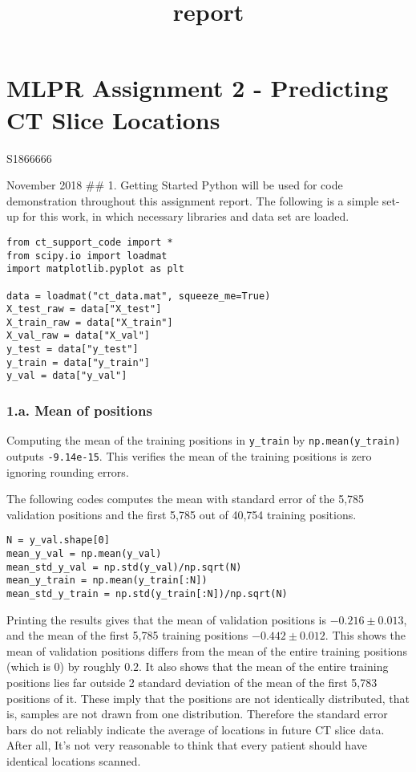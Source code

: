 \documentclass[11pt]{article}
\title{report}
\begin{document}
    
    
    \maketitle
    
    

    
    \hypertarget{mlpr-assignment-2---predicting-ct-slice-locations}{%
\section{MLPR Assignment 2 - Predicting CT Slice
Locations}\label{mlpr-assignment-2---predicting-ct-slice-locations}}

S1866666

November 2018 \#\# 1. Getting Started Python will be used for code
demonstration throughout this assignment report. The following is a
simple set-up for this work, in which necessary libraries and data set
are loaded.

\begin{verbatim}
from ct_support_code import *
from scipy.io import loadmat
import matplotlib.pyplot as plt

data = loadmat("ct_data.mat", squeeze_me=True)
X_test_raw = data["X_test"]
X_train_raw = data["X_train"]
X_val_raw = data["X_val"]
y_test = data["y_test"]
y_train = data["y_train"]
y_val = data["y_val"]
\end{verbatim}

\hypertarget{a.-mean-of-positions}{%
\subsubsection{1.a. Mean of positions}\label{a.-mean-of-positions}}

Computing the mean of the training positions in \texttt{y\_train} by
\texttt{np.mean(y\_train)} outputs \texttt{-9.14e-15}. This verifies the
mean of the training positions is zero ignoring rounding errors.

The following codes computes the mean with standard error of the 5,785
validation positions and the first 5,785 out of 40,754 training
positions.

\begin{verbatim}
N = y_val.shape[0]
mean_y_val = np.mean(y_val)
mean_std_y_val = np.std(y_val)/np.sqrt(N)
mean_y_train = np.mean(y_train[:N])
mean_std_y_train = np.std(y_train[:N])/np.sqrt(N)
\end{verbatim}

Printing the results gives that the mean of validation positions is
\(-0.216\pm 0.013\), and the mean of the first 5,785 training positions
\(-0.442\pm 0.012\). This shows the mean of validation positions differs
from the mean of the entire training positions (which is 0) by roughly
\(0.2\). It also shows that the mean of the entire training positions
lies far outside 2 standard deviation of the mean of the first 5,783
positions of it. These imply that the positions are not identically
distributed, that is, samples are not drawn from one distribution.
Therefore the standard error bars do not reliably indicate the average
of locations in future CT slice data. After all, It's not very
reasonable to think that every patient should have identical locations
scanned.
\end{document}
